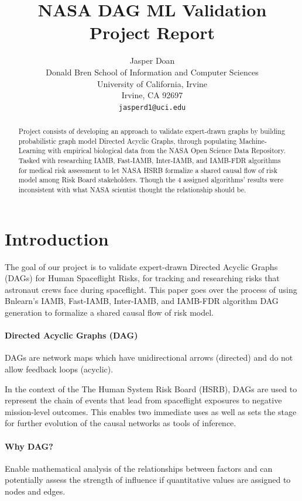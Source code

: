 \documentclass{article}
\title{NASA DAG ML Validation Project Report}
\author{
  Jasper Doan \\
  Donald Bren School of Information and Computer Sciences\\
  University of California, Irvine\\
  Irvine, CA 92697 \\
  \texttt{jasperd1@uci.edu} \\
}
\begin{document}
\maketitle
\begin{abstract}
Project consists of developing an approach to validate expert-drawn graphs by building probabilistic graph model Directed Acyclic Graphs, through populating Machine-Learning with empirical biological data from the NASA Open Science Data Repository. 
Tasked with researching IAMB, Fast-IAMB, Inter-IAMB, and IAMB-FDR algorithms for medical risk assessment to let NASA HSRB formalize a shared causal flow of risk model among Risk Board stakeholders. 
Though the 4 assigned algorithms' results were inconsistent with what NASA scientist thought the relationship should be. 
\end{abstract}




\section{Introduction}
The goal of our project is to validate expert-drawn Directed Acyclic Graphs (DAGs) for Human Spaceflight Risks, for tracking and researching risks that astronaut crews face during spaceflight.
This paper goes over the process of using Bnlearn's IAMB, Fast-IAMB, Inter-IAMB, and IAMB-FDR algorithm DAG generation to formalize a shared causal flow of risk model.

\paragraph{Directed Acyclic Graphs (DAG)}
DAGs are network maps which have unidirectional arrows (directed) and do not allow feedback loops (acyclic). 

In the context of the The Human System Risk Board (HSRB), DAGs are used to represent the chain of events that lead from spaceflight exposures to negative mission-level outcomes. This enables two immediate uses as well as sets the stage for further evolution of the causal networks as tools of inference.

\paragraph{Why DAG?}
Enable mathematical analysis of the relationships between factors and can potentially assess the strength of influence if quantitative values are assigned to nodes and edges.
\end{document}
